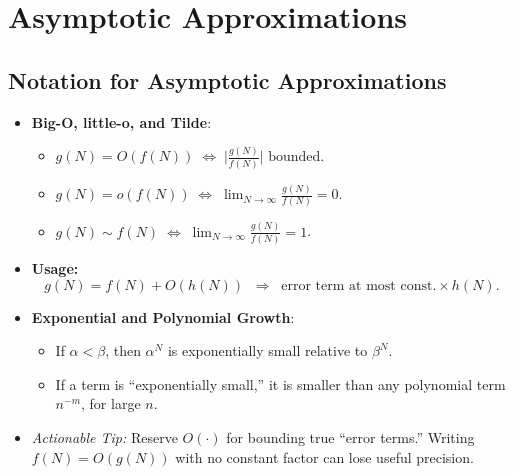 \documentclass[11pt,letterpaper]{article}
\begin{document}
\section{Asymptotic Approximations}

\subsection{Notation for Asymptotic Approximations}
\begin{itemize}
  \item \textbf{Big-O, little-o, and Tilde}:
    \begin{itemize}
      \item $g(N) = O(f(N)) \;\Longleftrightarrow\; \bigl|\tfrac{g(N)}{f(N)}\bigr|\text{ bounded}$.
      \item $g(N) = o(f(N)) \;\Longleftrightarrow\; \lim_{N\to\infty}\tfrac{g(N)}{f(N)} = 0$.
      \item $g(N) \sim f(N) \;\Longleftrightarrow\; \lim_{N\to\infty}\tfrac{g(N)}{f(N)} = 1$.
    \end{itemize}
  \item \textbf{Usage:} 
    \[
      g(N)=f(N) + O(h(N))\;\;\Rightarrow\;\;\text{error term at most const.}\times h(N).
    \]
  \item \textbf{Exponential and Polynomial Growth}: 
    \begin{itemize}
      \item If $\alpha < \beta$, then $\alpha^N$ is exponentially small relative to $\beta^N$.
      \item If a term is “exponentially small,” it is smaller than any polynomial term $n^{-m}$, for large $n$.
    \end{itemize}
  \item \emph{Actionable Tip:} Reserve $O(\cdot)$ for bounding true “error terms.” Writing $f(N) = O(g(N))$ with no constant factor can lose useful precision.
\end{itemize}

\end{document}
